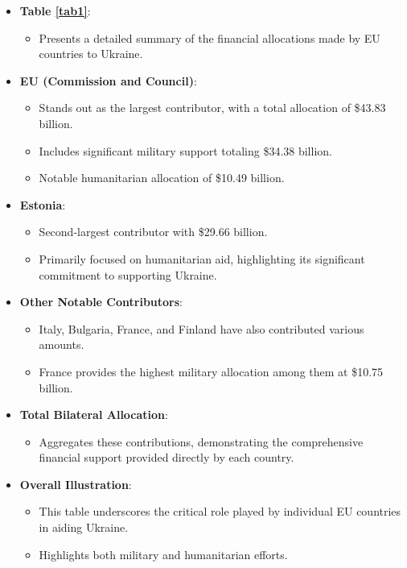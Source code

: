 \documentclass[12pt,preprint, authoryear]{elsarticle}
\numberwithin{equation}{section}
\numberwithin{figure}{section}
\numberwithin{table}{section}
\def\tightlist{} %
\begin{document}
\begin{itemize}
\item
  \textbf{Table \ref{tab1}}:

  \begin{itemize}
  \tightlist
  \item
    Presents a detailed summary of the financial allocations made by EU
    countries to Ukraine.
  \end{itemize}
\item
  \textbf{EU (Commission and Council)}:

  \begin{itemize}
  \tightlist
  \item
    Stands out as the largest contributor, with a total allocation of
    \$43.83 billion.
  \item
    Includes significant military support totaling \$34.38 billion.
  \item
    Notable humanitarian allocation of \$10.49 billion.
  \end{itemize}
\item
  \textbf{Estonia}:

  \begin{itemize}
  \tightlist
  \item
    Second-largest contributor with \$29.66 billion.
  \item
    Primarily focused on humanitarian aid, highlighting its significant
    commitment to supporting Ukraine.
  \end{itemize}
\item
  \textbf{Other Notable Contributors}:

  \begin{itemize}
  \tightlist
  \item
    Italy, Bulgaria, France, and Finland have also contributed various
    amounts.
  \item
    France provides the highest military allocation among them at
    \$10.75 billion.
  \end{itemize}
\item
  \textbf{Total Bilateral Allocation}:

  \begin{itemize}
  \tightlist
  \item
    Aggregates these contributions, demonstrating the comprehensive
    financial support provided directly by each country.
  \end{itemize}
\item
  \textbf{Overall Illustration}:

  \begin{itemize}
  \tightlist
  \item
    This table underscores the critical role played by individual EU
    countries in aiding Ukraine.
  \item
    Highlights both military and humanitarian efforts.
  \end{itemize}
\end{itemize}
\end{document}

